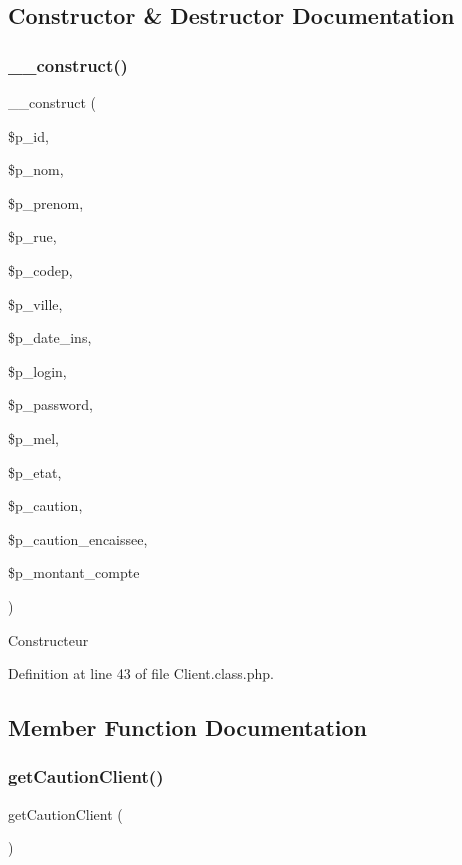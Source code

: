 \subsection{Constructor \& Destructor Documentation}
\mbox{\label{class_client_ad96ff90693d0dc40dbfee37bed59019e}} 
\subsubsection{\texorpdfstring{\+\_\+\+\_\+construct()}{\_\_construct()}}
{\footnotesize\ttfamily \+\_\+\+\_\+construct (\begin{DoxyParamCaption}\item[{}]{\$p\+\_\+id,  }\item[{}]{\$p\+\_\+nom,  }\item[{}]{\$p\+\_\+prenom,  }\item[{}]{\$p\+\_\+rue,  }\item[{}]{\$p\+\_\+codep,  }\item[{}]{\$p\+\_\+ville,  }\item[{}]{\$p\+\_\+date\+\_\+ins,  }\item[{}]{\$p\+\_\+login,  }\item[{}]{\$p\+\_\+password,  }\item[{}]{\$p\+\_\+mel,  }\item[{}]{\$p\+\_\+etat,  }\item[{}]{\$p\+\_\+caution,  }\item[{}]{\$p\+\_\+caution\+\_\+encaissee,  }\item[{}]{\$p\+\_\+montant\+\_\+compte }\end{DoxyParamCaption})}

Constructeur 

Definition at line 43 of file Client.\+class.\+php.



\subsection{Member Function Documentation}
\mbox{\label{class_client_afa5984ee7b2e06b717a27ec545fd7541}} 
\subsubsection{\texorpdfstring{get\+Caution\+Client()}{getCautionClient()}}
{\footnotesize\ttfamily get\+Caution\+Client (\begin{DoxyParamCaption}{ }\end{DoxyParamCaption})}



